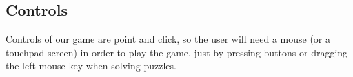 \subsection{Controls}
Controls of our game are point and click, so the user will need a mouse (or a touchpad screen) in order to play the game, just by pressing buttons or dragging the left mouse key when solving puzzles.\\